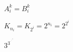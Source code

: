 \documentclass[nofonts]{ctexbook}
\begin{document}
$ A^k_i = B^k_i $

$ K_{n_i} = K_{2^i} = 2^{n_i} = 2^{2^i} $

$ 3^{3^{\cdot^{\cdot^{\cdot^3}}}} $
\end{document}
